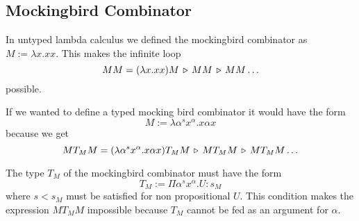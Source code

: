 \subsection{Mockingbird Combinator}

In untyped lambda calculus we defined the mockingbird combinator as $M :=
\lambda x . x x$. This makes the infinite loop
$$
MM = (\lambda x . x x) M \,\triangleright\, M M \,\triangleright\, M M \ldots
$$
%
possible.

If we wanted to define a typed mocking bird combinator it would have the form
$$
M := \lambda \alpha^s x^\alpha. x \alpha x
$$
because we get
$$
M T_M M
= (\lambda \alpha^s x^\alpha. x \alpha x) T_M M
\,\triangleright\, M T_M M
\,\triangleright\, M T_M M \ldots
$$

The type $T_M$ of the mockingbird combinator must have the form
$$
T_M := \Pi \alpha^s x^\alpha. U : s_M
$$
where $s < s_M$ must be satisfied for non propositional $U$. This condition
makes the expression $M T_M M$ impossible because $T_M$ cannot be fed as an
argument for $\alpha$.

